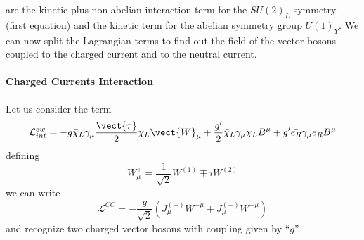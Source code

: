 are the kinetic plus non abelian interaction term for the $SU(2)_{L}$ symmetry
(first equation) and the kinetic term for the abelian symmetry group
$U(1)_{Y}$. We can now split the Lagrangian terms to find out the field of the
vector bosons coupled to the charged current and to the neutral current.

\paragraph{Charged Currents Interaction}
\label{sec:charg-curr-inter}
Let us consider the term
\begin{equation}
  \label{eq:15}
  \mathcal{L}_{int}^{ew} = - g \bar{\chi}_{L} \gamma_{\mu}
  \frac{\vect{\tau}}{2} \chi_{L} \vect{W}_{\mu} + \frac{g'}{2}
  \bar{\chi}_{L} \gamma_{\mu} \chi_{L} B^{\mu} + g' \bar{e_{R}}
  \gamma_{\mu} e_{R} B^{\mu}
\end{equation}
defining
\begin{equation}
  \label{eq:16}
  W^{\pm}_{\mu} = \frac{1}{\sqrt{2}} W^{(1)} \mp i W^{(2)}
\end{equation}
we can write
\begin{equation}
  \label{eq:17}
  \mathcal{L}^{CC} = - \frac{g}{\sqrt{2}} (J^{(+)}_{\mu} W^{- \mu} +
  J^{(-)}_{\mu} W^{+ \mu})
\end{equation}
and recognize two charged vector bosons with coupling given by ``$g$''.

